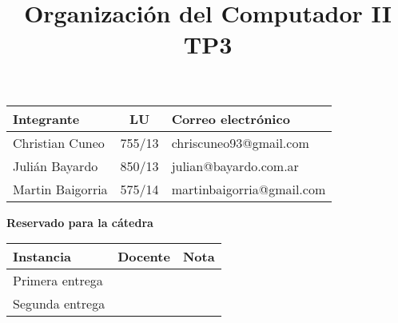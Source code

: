 \documentclass[10pt,a4paper]{article}
\title{Organización del Computador II \\ TP3}
\begin{document}

\maketitle

\bigskip
\normalsize
\begin{table}[h]
\centering
\begin{tabular}{|l l l|}
\hline
Integrante       & \multicolumn{1}{c}{LU}     & Correo electrónico        \\ \hline
Christian Cuneo & \multicolumn{1}{c}{755/13} & chriscuneo93@gmail.com \\ 
Julián Bayardo & 850/13                      & julian@bayardo.com.ar \\
Martin Baigorria & 575/14          & martinbaigorria@gmail.com \\ \hline
\end{tabular}
\end{table}

\vfill

\begin{center}
\textbf{Reservado para la cátedra}
\end{center}
\begin{table}[h]
\centering
\begin{tabular}{|l|l|l|}
\hline
Instancia       & Docente & Nota \\ \hline
Primera entrega &         &      \\ \hline
Segunda entrega &         &      \\ \hline
\end{tabular}
\end{table}

\newpage
\tableofcontents


\pagebreak


\pagebreak


\pagebreak


\end{document}

